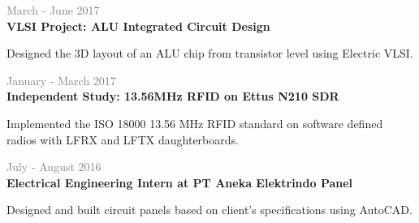 \documentclass[letterpage]{article}
\begin{document}
\begin{minipage}[t]{0.63\linewidth}
\vspace{7px}
\textcolor{gray}{March - June 2017}\\
\textbf{\textsf{VLSI Project: ALU Integrated Circuit Design}}\\
\raggedright
Designed the 3D layout of an ALU chip from transistor level
using Electric VLSI.

\vspace{7px}
\textcolor{gray}{January - March 2017}\\
\textbf{\textsf{Independent Study: 13.56MHz RFID on Ettus N210 SDR}}\\
\raggedright
Implemented the ISO 18000 13.56 MHz RFID standard on software defined
radios with LFRX and LFTX daughterboards.

\vspace{7px}
\textcolor{gray}{July - August 2016}\\
\textbf{\textsf{Electrical Engineering Intern
at PT Aneka Elektrindo Panel}}\\
\raggedright
Designed and built circuit panels based on client's
specifications using AutoCAD.


\end{minipage}
\end{document}
